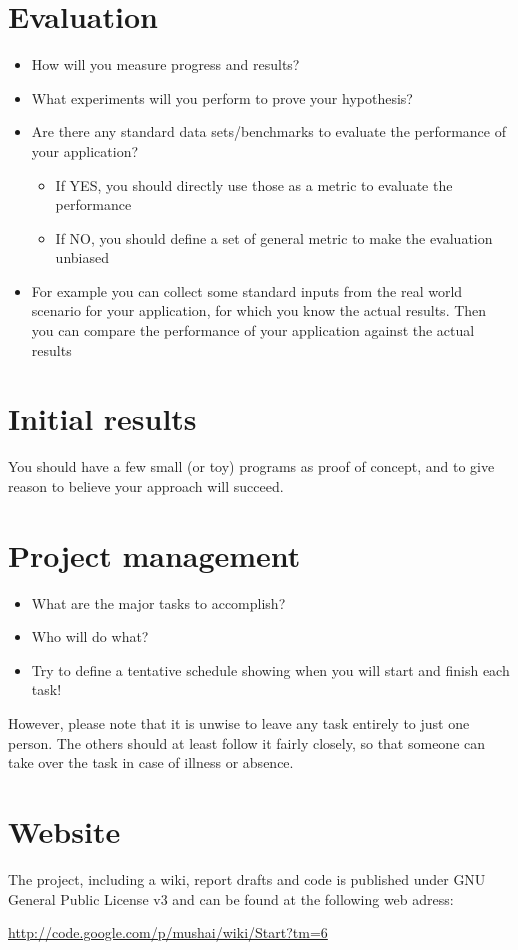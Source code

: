 \documentclass[times, 10pt,twocolumn]{article}
\begin{document}
\section{Evaluation}

\begin{itemize}
	\item{How will you measure progress and results?}
	\item{What experiments will you perform to prove your hypothesis?}
	\item{Are there any standard data sets/benchmarks to evaluate the performance of your application?}
	\begin{itemize}
		\item{If YES, you should directly use those as a metric to evaluate the performance}
		\item{If NO, you should define a set of general metric to make the evaluation unbiased}
	\end{itemize}
	\item{For example you can collect some standard inputs from the real world scenario for your application, for which you know the actual results. Then you can compare the performance of your application against the actual results}
\end{itemize}

\section{Initial results}
You should have a few small (or toy) programs as proof of concept, and to give reason to believe your approach will succeed.

\section{Project management}
\begin{itemize}
	\item{What are the major tasks to accomplish?}
	\item{Who will do what?}
	\item{Try to define a tentative schedule showing when you will start and finish each task!}
\end{itemize}
However, please note that it is unwise to leave any task entirely to just one person. The others should at least follow it fairly closely, so that someone can take over the task in case of illness or absence.

\section{Website}
The project, including a wiki, report drafts and code is published under GNU General Public License v3 and can be found at the following web adress:

\url{http://code.google.com/p/mushai/wiki/Start?tm=6}

\nocite{games_solved,course_book}


\end{document}
